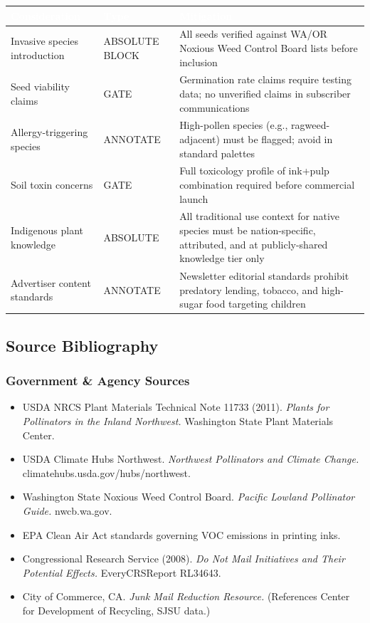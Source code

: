 \documentclass[11pt,letterpaper]{article}
\newcommand{\tableheader}[1]{\textbf{\sffamily\textcolor{white}{#1}}}
\begin{document}
\begin{center}
\begin{tabularx}{\textwidth}{L{3.5cm}L{2.5cm}X}
\toprule
{}
\tableheader{Consideration} & \tableheader{Type} & \tableheader{Mitigation} \\
\midrule
Invasive species introduction & ABSOLUTE BLOCK & All seeds verified against WA/OR Noxious Weed Control Board lists before inclusion \\
Seed viability claims & GATE & Germination rate claims require testing data; no unverified claims in subscriber communications \\
Allergy-triggering species & ANNOTATE & High-pollen species (e.g., ragweed-adjacent) must be flagged; avoid in standard palettes \\
Soil toxin concerns & GATE & Full toxicology profile of ink+pulp combination required before commercial launch \\
Indigenous plant knowledge & ABSOLUTE & All traditional use context for native species must be nation-specific, attributed, and at publicly-shared knowledge tier only \\
Advertiser content standards & ANNOTATE & Newsletter editorial standards prohibit predatory lending, tobacco, and high-sugar food targeting children \\
\bottomrule
\end{tabularx}
\end{center}

\subsection{Source Bibliography}

\subsubsection{Government \& Agency Sources}
\begin{itemize}[leftmargin=1.5em]
  \item USDA NRCS Plant Materials Technical Note 11733 (2011). \textit{Plants for Pollinators in the Inland Northwest.} Washington State Plant Materials Center.
  \item USDA Climate Hubs Northwest. \textit{Northwest Pollinators and Climate Change.} climatehubs.usda.gov/hubs/northwest.
  \item Washington State Noxious Weed Control Board. \textit{Pacific Lowland Pollinator Guide.} nwcb.wa.gov.
  \item EPA Clean Air Act standards governing VOC emissions in printing inks.
  \item Congressional Research Service (2008). \textit{Do Not Mail Initiatives and Their Potential Effects.} EveryCRSReport RL34643.
  \item City of Commerce, CA. \textit{Junk Mail Reduction Resource.} (References Center for Development of Recycling, SJSU data.)
\end{itemize}
\end{document}
